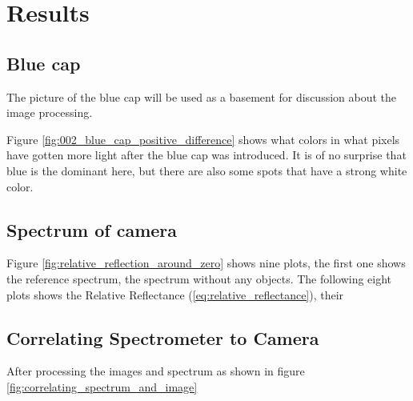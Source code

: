 \section{Results}

\subsection{Blue cap}
\label{sec:blue_cap_discussion}
The picture of the blue cap will be used as a basement for discussion about the image processing. 

Figure \ref{fig:002_blue_cap_positive_difference} shows what colors in what pixels have gotten more light after the blue cap was introduced. It is of no surprise that blue is the dominant here, but there are also some spots that have a strong white color. 


\subsection{Spectrum of camera}
Figure \ref{fig:relative_reflection_around_zero} shows nine plots, the first one shows the reference spectrum, the spectrum without any objects. The following eight plots shows the Relative Reflectance (\ref{eq:relative_reflectance}), their 




\subsection{Correlating Spectrometer to Camera}

After processing the images and spectrum as shown in figure \ref{fig:correlating_spectrum_and_image} 
